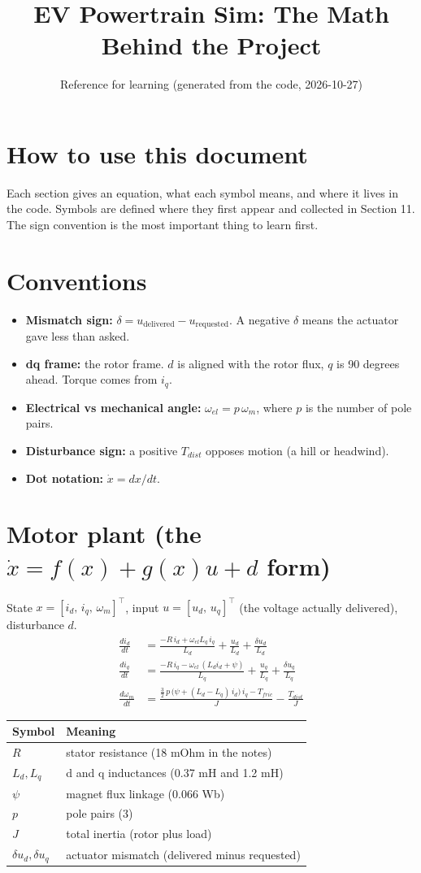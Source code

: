 \documentclass[11pt]{article}
\title{EV Powertrain Sim: The Math Behind the Project}
\author{Reference for learning (generated from the code, 2026-10-27)}
\date{}
\begin{document}
\maketitle

\section*{How to use this document}
Each section gives an equation, what each symbol means, and where it lives in the code. Symbols are defined where they first appear and collected in Section 11. The sign convention is the most important thing to learn first.

\section{Conventions}
\begin{itemize}
\item \textbf{Mismatch sign:} $\delta = u_{\text{delivered}} - u_{\text{requested}}$. A negative $\delta$ means the actuator gave less than asked.
\item \textbf{dq frame:} the rotor frame. $d$ is aligned with the rotor flux, $q$ is 90 degrees ahead. Torque comes from $i_q$.
\item \textbf{Electrical vs mechanical angle:} $\omega_{el} = p\,\omega_m$, where $p$ is the number of pole pairs.
\item \textbf{Disturbance sign:} a positive $T_{dist}$ opposes motion (a hill or headwind).
\item \textbf{Dot notation:} $\dot{x} = dx/dt$.
\end{itemize}

\section{Motor plant (the $\dot{x} = f(x) + g(x)u + d$ form)}
State $x = [i_d,\, i_q,\, \omega_m]^\top$, input $u = [u_d,\, u_q]^\top$ (the voltage actually delivered), disturbance $d$.
\begin{align}
\frac{di_d}{dt} &= \frac{-R\,i_d + \omega_{el} L_q\, i_q}{L_d} + \frac{u_d}{L_d} + \frac{\delta u_d}{L_d}\\
\frac{di_q}{dt} &= \frac{-R\,i_q - \omega_{el}\,(L_d i_d + \psi)}{L_q} + \frac{u_q}{L_q} + \frac{\delta u_q}{L_q}\\
\frac{d\omega_m}{dt} &= \frac{\tfrac{3}{2}\,p\,\big(\psi + (L_d - L_q)\,i_d\big)\, i_q - T_{fric}}{J} - \frac{T_{dist}}{J}
\end{align}
\begin{tabular}{@{}ll@{}}
\toprule
Symbol & Meaning \\
\midrule
$R$ & stator resistance (18 mOhm in the notes) \\
$L_d, L_q$ & d and q inductances (0.37 mH and 1.2 mH) \\
$\psi$ & magnet flux linkage (0.066 Wb) \\
$p$ & pole pairs (3) \\
$J$ & total inertia (rotor plus load) \\
$\delta u_d, \delta u_q$ & actuator mismatch (delivered minus requested) \\
\bottomrule
\end{tabular}
\end{document}
